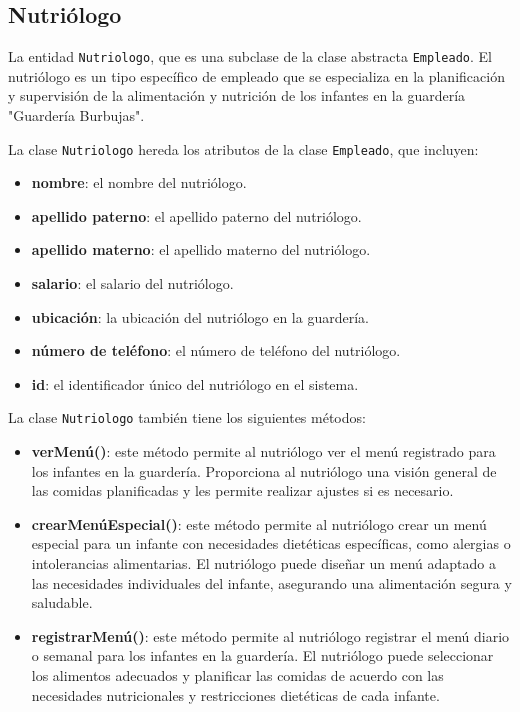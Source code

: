 \subsection{Nutriólogo}

La entidad \texttt{Nutriologo}, que es una subclase de la clase abstracta \texttt{Empleado}. El nutriólogo es un tipo específico de empleado que se especializa en la planificación y supervisión de la alimentación y nutrición de los infantes en la guardería "Guardería Burbujas".

La clase \texttt{Nutriologo} hereda los atributos de la clase \texttt{Empleado}, que incluyen:

\begin{itemize}
\item \textbf{nombre}: el nombre del nutriólogo.
\item \textbf{apellido paterno}: el apellido paterno del nutriólogo.
\item \textbf{apellido materno}: el apellido materno del nutriólogo.

\item \textbf{salario}: el salario del nutriólogo.
\item \textbf{ubicación}: la ubicación del nutriólogo en la guardería.

\item \textbf{número de teléfono}: el número de teléfono del nutriólogo.
\item \textbf{id}: el identificador único del nutriólogo en el sistema.
\end{itemize}

La clase \texttt{Nutriologo} también tiene los siguientes métodos:

\begin{itemize}
\item \textbf{verMenú()}: este método permite al nutriólogo ver el menú registrado para los infantes en la guardería. Proporciona al nutriólogo una visión general de las comidas planificadas y les permite realizar ajustes si es necesario.
\item \textbf{crearMenúEspecial()}: este método permite al nutriólogo crear un menú especial para un infante con necesidades dietéticas específicas, como alergias o intolerancias alimentarias. El nutriólogo puede diseñar un menú adaptado a las necesidades individuales del infante, asegurando una alimentación segura y saludable.
\item \textbf{registrarMenú()}: este método permite al nutriólogo registrar el menú diario o semanal para los infantes en la guardería. El nutriólogo puede seleccionar los alimentos adecuados y planificar las comidas de acuerdo con las necesidades nutricionales y restricciones dietéticas de cada infante.
\end{itemize}

